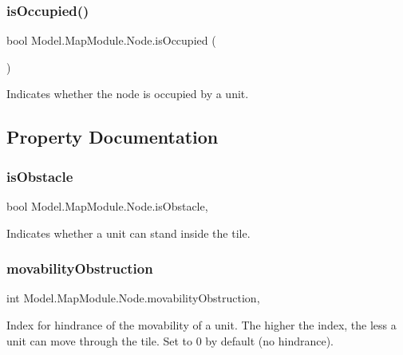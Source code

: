 \subsubsection{\texorpdfstring{is\+Occupied()}{isOccupied()}}
{\footnotesize\ttfamily bool Model.\+Map\+Module.\+Node.\+is\+Occupied (\begin{DoxyParamCaption}{ }\end{DoxyParamCaption})\hspace{0.3cm}{\ttfamily [inline]}}

Indicates whether the node is occupied by a unit. 

\subsection{Property Documentation}
\hypertarget{class_model_1_1_map_module_1_1_node_adebdc4bf4bee0c34caadc3d8cc9e1d35}{}\label{class_model_1_1_map_module_1_1_node_adebdc4bf4bee0c34caadc3d8cc9e1d35} 
\subsubsection{\texorpdfstring{is\+Obstacle}{isObstacle}}
{\footnotesize\ttfamily bool Model.\+Map\+Module.\+Node.\+is\+Obstacle\hspace{0.3cm}{\ttfamily [get]}, {\ttfamily [set]}}

Indicates whether a unit can stand inside the tile. \hypertarget{class_model_1_1_map_module_1_1_node_a73c035dbce10c987f99e1d99a8abf928}{}\label{class_model_1_1_map_module_1_1_node_a73c035dbce10c987f99e1d99a8abf928} 
\subsubsection{\texorpdfstring{movability\+Obstruction}{movabilityObstruction}}
{\footnotesize\ttfamily int Model.\+Map\+Module.\+Node.\+movability\+Obstruction\hspace{0.3cm}{\ttfamily [get]}, {\ttfamily [set]}}

Index for hindrance of the movability of a unit. The higher the index, the less a unit can move through the tile. Set to 0 by default (no hindrance). \hypertarget{class_model_1_1_map_module_1_1_node_a0998a1b014ec056f419e0510ec8c0e26}{}\label{class_model_1_1_map_module_1_1_node_a0998a1b014ec056f419e0510ec8c0e26} 
